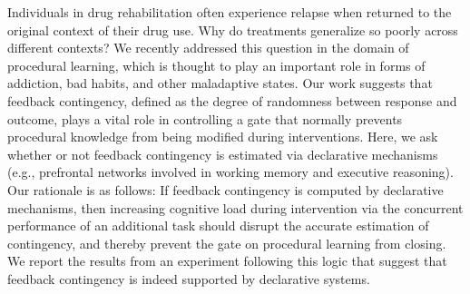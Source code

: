 Individuals in drug rehabilitation often experience relapse when returned to the
original context of their drug use. Why do treatments generalize so poorly
across different contexts? We recently addressed this question in the domain of
procedural learning, which is thought to play an important role in forms of
addiction, bad habits, and other maladaptive states. Our work suggests that
feedback contingency, defined as the degree of randomness between response and
outcome, plays a vital role in controlling a gate that normally prevents
procedural knowledge from being modified during interventions. Here, we ask
whether or not feedback contingency is estimated via declarative mechanisms
(e.g., prefrontal networks involved in working memory and executive reasoning).
Our rationale is as follows: If feedback contingency is computed by declarative
mechanisms, then increasing cognitive load during intervention via the
concurrent performance of an additional task should disrupt the accurate
estimation of contingency, and thereby prevent the gate on procedural learning
from closing. We report the results from an experiment following this logic that
suggest that feedback contingency is indeed supported by declarative systems.
